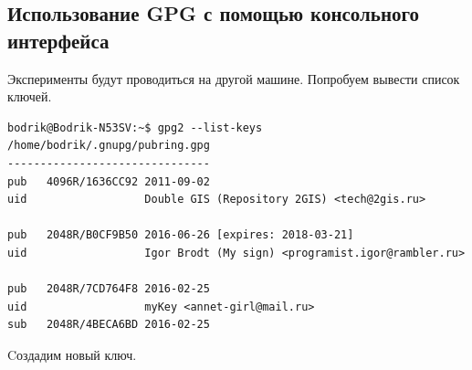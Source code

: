\subsection{Использование GPG с помощью консольного интерфейса}

Эксперименты будут проводиться на другой машине. Попробуем вывести список ключей.

\begin{verbatim}  
bodrik@Bodrik-N53SV:~$ gpg2 --list-keys
/home/bodrik/.gnupg/pubring.gpg
-------------------------------
pub   4096R/1636CC92 2011-09-02
uid                  Double GIS (Repository 2GIS) <tech@2gis.ru>

pub   2048R/B0CF9B50 2016-06-26 [expires: 2018-03-21]
uid                  Igor Brodt (My sign) <programist.igor@rambler.ru>

pub   2048R/7CD764F8 2016-02-25
uid                  myKey <annet-girl@mail.ru>
sub   2048R/4BECA6BD 2016-02-25
\end{verbatim}

Cоздадим новый ключ.

